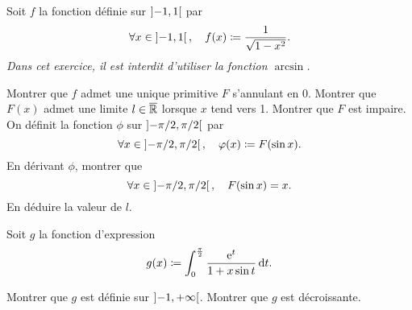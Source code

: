 \documentclass{magnolia}
\begin{document}






Soit $f$ la fonction définie sur $\left]-1,1\right[$ par
\[\forall x\in\left]-1,1\right[,\quad f(x)\coloneqq\frac{1}{\sqrt{1-x^2}}.\]
\emph{Dans cet exercice, il est interdit d'utiliser la fonction $\arcsin$.}
\begin{questions}
\question Montrer que $f$ admet une unique primitive $F$ s'annulant en 0.
\question Montrer que $F(x)$ admet une limite $l\in\overline{\mathbb{R}}$ lorsque $x$ tend vers 1.
\question Montrer que $F$ est impaire.
\enonce On définit la fonction $\phi$ sur $\left]-\pi/2,\pi/2\right[$ par
  \[\forall x\in\left]-\pi/2,\pi/2\right[,\quad \varphi(x)\coloneqq F(\sin x).\]
\question En dérivant $\phi$, montrer que
	\[\forall x\in\left]-\pi/2,\pi/2\right[,\quad F(\sin x)=x.\]
\question En déduire la valeur de $l$.
\end{questions}






Soit $g$ la fonction d'expression
\[g(x)\coloneqq\int_{0}^{\frac{\pi}{2}} \frac{{\rm e}^t}{1+x\sin t}\,\text{d}t.\]
\begin{questions}
\question Montrer que $g$ est définie sur $\left]-1,+\infty\right[$.
\question Montrer que $g$ est décroissante.
\end{questions}
\end{document}
